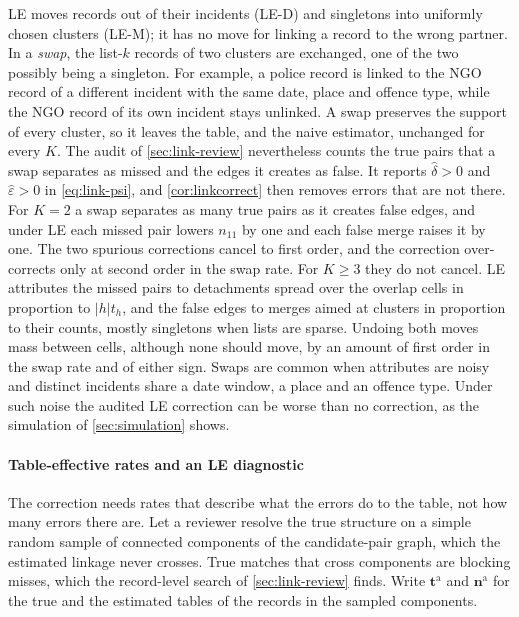 \begin{remark}[Swaps]\label{rem:link-swaps}
LE moves records out of their incidents (LE-D) and singletons into uniformly chosen clusters (LE-M); it has no move for linking a record to the wrong partner. In a \emph{swap}, the list-$k$ records of two clusters are exchanged, one of the two possibly being a singleton. For example, a police record is linked to the NGO record of a different incident with the same date, place and offence type, while the NGO record of its own incident stays unlinked. A swap preserves the support of every cluster, so it leaves the table, and the naive estimator, unchanged for every $K$. The audit of \cref{sec:link-review} nevertheless counts the true pairs that a swap separates as missed and the edges it creates as false. It reports $\hat\delta>0$ and $\hat\varepsilon>0$ in \eqref{eq:link-psi}, and \cref{cor:linkcorrect} then removes errors that are not there. For $K=2$ a swap separates as many true pairs as it creates false edges, and under LE each missed pair lowers $n_{11}$ by one and each false merge raises it by one. The two spurious corrections cancel to first order, and the correction over-corrects only at second order in the swap rate. For $K\ge3$ they do not cancel. LE attributes the missed pairs to detachments spread over the overlap cells in proportion to $|h|t_h$, and the false edges to merges aimed at clusters in proportion to their counts, mostly singletons when lists are sparse. Undoing both moves mass between cells, although none should move, by an amount of first order in the swap rate and of either sign. Swaps are common when attributes are noisy and distinct incidents share a date window, a place and an offence type. Under such noise the audited LE correction can be worse than no correction, as the simulation of \cref{sec:simulation} shows.
\end{remark}

\paragraph{Table-effective rates and an LE diagnostic}
The correction needs rates that describe what the errors do to the table, not how many errors there are. Let a reviewer resolve the true structure on a simple random sample of connected components of the candidate-pair graph, which the estimated linkage never crosses. True matches that cross components are blocking misses, which the record-level search of \cref{sec:link-review} finds. Write $\bm t^{\mathrm a}$ and $\bm n^{\mathrm a}$ for the true and the estimated tables of the records in the sampled components.

